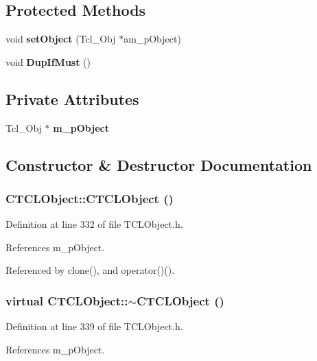 \subsection*{Protected Methods}
\begin{CompactItemize}
\item 
void {\bf set\-Object} (Tcl\_\-Obj $\ast$am\_\-p\-Object)
\item 
void {\bf Dup\-If\-Must} ()
\end{CompactItemize}
\subsection*{Private Attributes}
\begin{CompactItemize}
\item 
Tcl\_\-Obj $\ast$ {\bf m\_\-p\-Object}
\end{CompactItemize}


\subsection{Constructor \& Destructor Documentation}
\subsubsection{\setlength{\rightskip}{0pt plus 5cm}CTCLObject::CTCLObject ()\hspace{0.3cm}{\tt  [inline]}}\label{classCTCLObject_a0}




Definition at line 332 of file TCLObject.h.

References m\_\-p\-Object.

Referenced by clone(), and operator()().
\subsubsection{\setlength{\rightskip}{0pt plus 5cm}virtual CTCLObject::$\sim$CTCLObject ()\hspace{0.3cm}{\tt  [inline, virtual]}}\label{classCTCLObject_a1}




Definition at line 339 of file TCLObject.h.

References m\_\-p\-Object.
